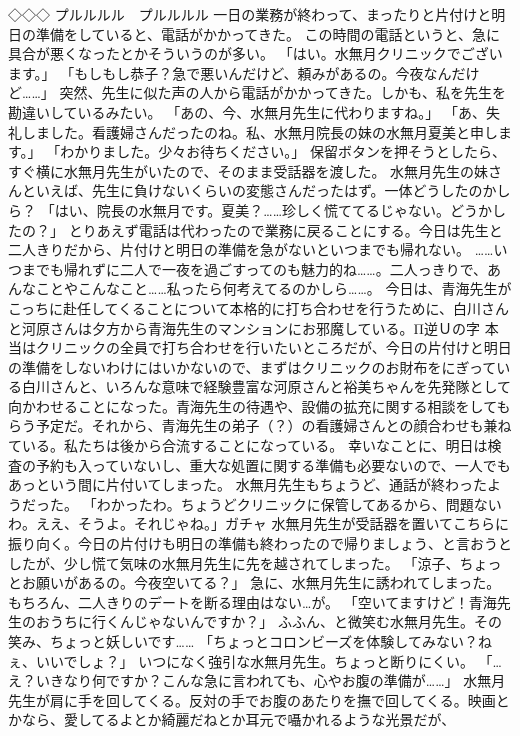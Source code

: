 ◇◇◇
プルルルル　プルルルル
一日の業務が終わって、まったりと片付けと明日の準備をしていると、電話がかかってきた。
この時間の電話というと、急に具合が悪くなったとかそういうのが多い。
「はい。水無月クリニックでございます。」
「もしもし恭子？急で悪いんだけど、頼みがあるの。今夜なんだけど……」
突然、先生に似た声の人から電話がかかってきた。しかも、私を先生を勘違いしているみたい。
「あの、今、水無月先生に代わりますね。」
「あ、失礼しました。看護婦さんだったのね。私、水無月院長の妹の水無月夏美と申します。」
「わかりました。少々お待ちください。」
保留ボタンを押そうとしたら、すぐ横に水無月先生がいたので、そのまま受話器を渡した。
水無月先生の妹さんといえば、先生に負けないくらいの変態さんだったはず。一体どうしたのかしら？
「はい、院長の水無月です。夏美？……珍しく慌ててるじゃない。どうかしたの？」
とりあえず電話は代わったので業務に戻ることにする。今日は先生と二人きりだから、片付けと明日の準備を急がないといつまでも帰れない。
……いつまでも帰れずに二人で一夜を過ごすってのも魅力的ね……。二人っきりで、あんなことやこんなこと……私ったら何考えてるのかしら……。
今日は、青海先生がこっちに赴任してくることについて本格的に打ち合わせを行うために、白川さんと河原さんは夕方から青海先生のマンションにお邪魔している。Π逆Ｕの字
本当はクリニックの全員で打ち合わせを行いたいところだが、今日の片付けと明日の準備をしないわけにはいかないので、まずはクリニックのお財布をにぎっている白川さんと、いろんな意味で経験豊富な河原さんと裕美ちゃんを先発隊として向かわせることになった。青海先生の待遇や、設備の拡充に関する相談をしてもらう予定だ。それから、青海先生の弟子（？）の看護婦さんとの顔合わせも兼ねている。私たちは後から合流することになっている。
幸いなことに、明日は検査の予約も入っていないし、重大な処置に関する準備も必要ないので、一人でもあっという間に片付いてしまった。
水無月先生もちょうど、通話が終わったようだった。
「わかったわ。ちょうどクリニックに保管してあるから、問題ないわ。ええ、そうよ。それじゃね。」ガチャ
水無月先生が受話器を置いてこちらに振り向く。今日の片付けも明日の準備も終わったので帰りましょう、と言おうとしたが、少し慌て気味の水無月先生に先を越されてしまった。
「涼子、ちょっとお願いがあるの。今夜空いてる？」
急に、水無月先生に誘われてしまった。もちろん、二人きりのデートを断る理由はない…が。
「空いてますけど！青海先生のおうちに行くんじゃないんですか？」
ふふん、と微笑む水無月先生。その笑み、ちょっと妖しいです……
「ちょっとコロンビーズを体験してみない？ねぇ、いいでしょ？」
いつになく強引な水無月先生。ちょっと断りにくい。
「…え？いきなり何ですか？こんな急に言われても、心やお腹の準備が……」
水無月先生が肩に手を回してくる。反対の手でお腹のあたりを撫で回してくる。映画とかなら、愛してるよとか綺麗だねとか耳元で囁かれるような光景だが、
